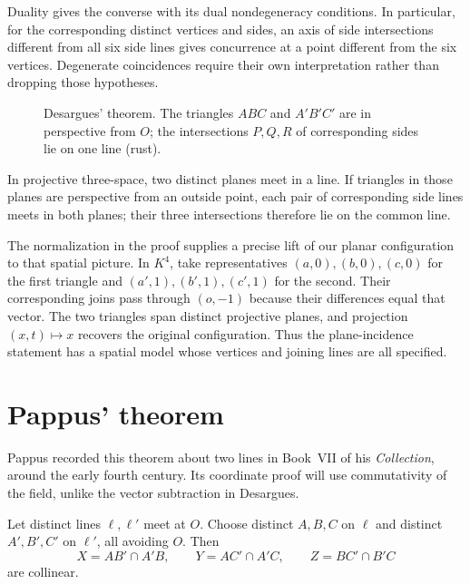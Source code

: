 Duality gives the converse with its dual nondegeneracy conditions. In particular, for the corresponding distinct vertices and sides, an axis of side intersections different from all six side lines gives concurrence at a point different from the six vertices. Degenerate coincidences require their own interpretation rather than dropping those hypotheses.

\begin{figure}[ht]
\centering
{}
\caption{Desargues' theorem. The triangles $ABC$ and $A'B'C'$ are in perspective from $O$; the intersections $P,Q,R$ of corresponding sides
lie on one line (rust).}
\label{geometry:fig:desargues}
\end{figure}

\begin{beauty}
In projective three-space, two distinct planes meet in a line. If triangles in those planes are perspective from an outside point, each pair of corresponding side lines meets in both planes; their three intersections therefore lie on the common line.

The normalization in the proof supplies a precise lift of our planar configuration to that spatial picture. In $K^4$, take representatives $(a,0),(b,0),(c,0)$ for the first triangle and $(a',1),(b',1),(c',1)$ for the second. Their corresponding joins pass through $(o,-1)$ because their differences equal that vector. The two triangles span distinct projective planes, and projection $(x,t)\mapsto x$ recovers the original configuration. Thus the plane-incidence statement has a spatial model whose vertices and joining lines are all specified.
\end{beauty}

\section{Pappus' theorem}

Pappus recorded this theorem about two lines in Book~VII of his \emph{Collection}, around the early fourth century. Its coordinate proof will use commutativity of the field, unlike the vector subtraction in Desargues.

\begin{theorem}[Pappus]\label{geometry:thm:pappusline}
Let distinct lines $\ell,\ell'$ meet at $O$. Choose distinct $A,B,C$ on $\ell$ and distinct $A',B',C'$ on $\ell'$, all avoiding $O$. Then
\[
X=AB'\cap A'B,\qquad Y=AC'\cap A'C,\qquad Z=BC'\cap B'C
\]
are collinear.
\end{theorem}

